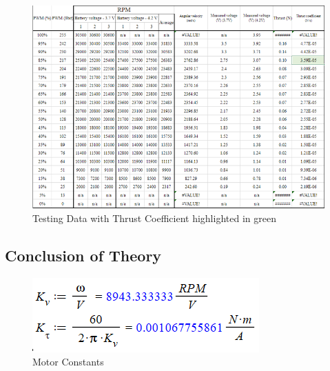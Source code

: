 \begin{figure}[H]
\begin{center}
   \includegraphics[scale =0.8]{pictures/control/BigData.png}
\end{center}
\caption{Testing Data with Thrust Coefficient highlighted in green}
\end{figure}

\subsection{Conclusion of Theory}

\begin{figure}[H]
\begin{center}
   \includegraphics[scale =1]{pictures/control/Motor constants calc.png}
\end{center}
\caption{Motor Constants}
\end{figure}